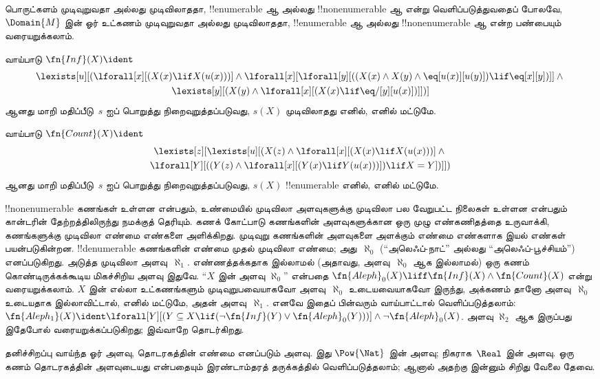 \documentclass[../../../include/open-logic-section]{subfiles}
\begin{document}



\begin{explain}
பொருட்களம் முடிவுறுவதா அல்லது முடிவிலாததா, !!{enumerable} ஆ அல்லது
!!{nonenumerable} ஆ என்று வெளிப்படுத்துவதைப் போலவே,
~$\Domain{M}$ இன் ஓர் உட்கணம் முடிவுறுவதா அல்லது முடிவிலாததா,
!!{enumerable} ஆ அல்லது !!{nonenumerable} ஆ என்ற பண்பையும்
வரையறுக்கலாம்.
\end{explain}

\begin{prop}
வாய்பாடு $\fn{Inf}(X) \ident$
\begin{multline*}
\lexists[u][(\lforall[x][(X(x) \lif X(u(x)))] \land {}
  \lforall[x][\lforall[y][((X(x) \land X(y) \land
      \eq[u(x)][u(y)]) \lif \eq[x][y])]] \land {}\\
  \lexists[y][(X(y) \land \lforall[x][(X(x)
      \lif \eq/[y][u(x)])]])]
\end{multline*}
ஆனது மாறி மதிப்பீடு~$s$ ஐப் பொறுத்து நிறைவுறுத்தப்படுவது,
$s(X)$ முடிவிலாதது எனில், எனில் மட்டுமே.
\end{prop}

\begin{prop}
வாய்பாடு $\fn{Count}(X) \ident $
\begin{multline*}
\lexists[z][\lexists[u][(X(z) \land
    \lforall[x][(X(x) \lif X(u(x)))] \land {} \\ \lforall[Y][((Y(z) \land
      \lforall[x][(Y(x) \lif Y(u(x)))]) \lif X = Y])]])
\end{multline*}
ஆனது மாறி மதிப்பீடு~$s$ ஐப் பொறுத்து நிறைவுறுத்தப்படுவது,
$s(X)$ !!{enumerable} எனில், எனில் மட்டுமே.
\end{prop}

!!{nonenumerable} கணங்கள் உள்ளன என்பதும், உண்மையில் முடிவிலா
அளவுகளுக்கு முடிவிலா பல வேறுபட்ட நிலைகள் உள்ளன என்பதும் கான்டரின்
தேற்றத்திலிருந்து நமக்குத் தெரியும். கணக் கோட்பாடு கணங்களின்
அளவுகளுக்கான ஒரு முழு எண்கணிதத்தை உருவாக்கி, கணங்களுக்கு முடிவிலா
எண்மை எண்களை அளிக்கிறது. முடிவுறு கணங்களின் அளவுகளை அளக்கும் எண்மை
எண்களாக இயல் எண்கள் பயன்படுகின்றன. !!{denumerable} கணங்களின் எண்மை
முதல் முடிவிலா எண்மை; அது~$\aleph_0$ (“அலெஃப்-நாட்” அல்லது
“அலெஃப்-பூச்சியம்”) எனப்படுகிறது. அடுத்த முடிவிலா அளவு~$\aleph_1$.
எண்ணத்தக்கதாக இல்லாமல் (அதாவது, அளவு~$\aleph_0$ ஆக இல்லாமல்)
ஒரு கணம் கொண்டிருக்கக்கூடிய மிகச்சிறிய அளவு இதுவே. “$X$ இன் அளவு
$\aleph_0$” என்பதை
$\fn{Aleph}_0(X) \liff \fn{Inf}(X) \land \fn{Count}(X)$ என்று
வரையறுக்கலாம். $X$ இன் எல்லா உட்கணங்களும் முடிவுறுபவையாகவோ
அளவு~$\aleph_0$ உடையவையாகவோ இருந்து, அக்கணம் தானோ
அளவு~$\aleph_0$ உடையதாக இல்லாவிட்டால், எனில் மட்டுமே,
அதன் அளவு~$\aleph_1$. எனவே இதைப் பின்வரும் வாய்பாட்டால்
வெளிப்படுத்தலாம்:
$\fn{Aleph_1}(X) \ident \lforall[Y][(Y \subseteq X \lif
  (\lnot\fn{Inf}(Y) \lor \fn{Aleph}_0(Y)))] \land \lnot
\fn{Aleph}_0(X)$. அளவு $ \aleph_2$ ஆக இருப்பது இதேபோல்
வரையறுக்கப்படுகிறது; இவ்வாறே தொடர்கிறது.

தனிச்சிறப்பு வாய்ந்த ஓர் அளவு, தொடரகத்தின் எண்மை எனப்படும் அளவு.
இது $\Pow{\Nat}$ இன் அளவு; நிகராக~$\Real$ இன் அளவு.
ஒரு கணம் தொடரகத்தின் அளவுடையது என்பதையும் இரண்டாம்தரத் தருக்கத்தில்
வெளிப்படுத்தலாம்; ஆனால் அதற்கு இன்னும் சிறிது வேலை தேவை.
\end{document}
